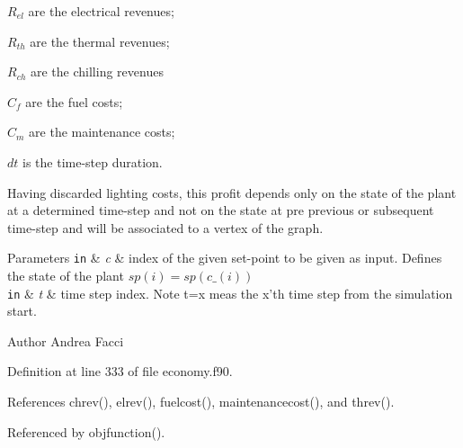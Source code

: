 \begin{DoxyItemize}
\item $R_{el}$ are the electrical revenues;
\item $R_{th}$ are the thermal revenues;
\item $R_{ch}$ are the chilling revenues
\item $C_{f}$ are the fuel costs;
\item $C_{m}$ are the maintenance costs;
\item $ dt$ is the time-\/step duration.\par
 Having discarded lighting costs, this profit depends only on the state of the plant at a determined time-\/step and not on the state at pre previous or subsequent time-\/step and will be associated to a vertex of the graph. 
\begin{DoxyParams}[1]{Parameters}
\mbox{\tt in}  & {\em c} & index of the given set-\/point to be given as input. Defines the state of the plant $sp(i) = sp(c\_(i))$ \\
\hline
\mbox{\tt in}  & {\em t} & time step index. Note t=x meas the x'th time step from the simulation start. \\
\hline
\end{DoxyParams}
\begin{DoxyAuthor}{Author}
Andrea Facci 
\end{DoxyAuthor}

\end{DoxyItemize}

Definition at line 333 of file economy.\-f90.



References chrev(), elrev(), fuelcost(), maintenancecost(), and threv().



Referenced by objfunction().

